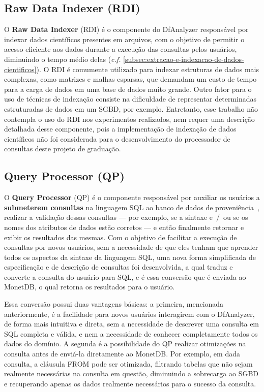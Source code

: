 \subsection{Raw Data Indexer (RDI)}

O \textbf{Raw Data Indexer} (RDI) é o componente do DfAnalyzer responsável por indexar dados científicos presentes em arquivos, com o objetivo de permitir o acesso eficiente aos dados durante a execução das consultas pelos usuários, diminuindo o tempo médio delas (\textit{c.f.} \autoref{subsec:extracao-e-indexacao-de-dados-cientificos}). O RDI é comumente utilizado para indexar estruturas de dados mais complexas, como matrizes e malhas esparsas, que demandam um custo de tempo para a carga de dados em uma base de dados muito grande. Outro fator para o uso de técnicas de indexação consiste na dificuldade de representar determinadas estruturadas de dados em um SGBD, por exemplo. Entretanto, esse trabalho não contempla o uso do RDI nos experimentos realizados, nem requer uma descrição detalhada desse componente, pois a implementação de indexação de dados científicos não foi considerada para o desenvolvimento do processador de consultas deste projeto de graduação.

\subsection{Query Processor (QP)}

O \textbf{Query Processor} (QP) é o componente responsável por auxiliar os usuários a \textbf{submeterem consultas} na linguagem SQL ao banco de dados de proveniência~\cite{silva2016situ}, realizar a validação dessas consultas --- por exemplo, se a sintaxe e~/~ou se os nomes dos atributos de dados estão corretos --- e então finalmente retornar e exibir os resultados das mesmas. Com o objetivo de facilitar a execução de consultas por novos usuários, sem a necessidade de que eles tenham que aprender todos os aspectos da sintaxe da linguagem SQL, uma nova forma simplificada de especificação e de descrição de consultas foi desenvolvida, a qual traduz e converte a consulta do usuário para SQL, e é essa conversão que é enviada ao MonetDB, o qual retorna os resultados para o usuário.

Essa conversão possui duas vantagens básicas: a primeira, mencionada anteriormente, é a facilidade para novos usuários interagirem com o DfAnalyzer, de forma mais intuitiva e direta, sem a necessidade de descrever uma consulta em SQL completa e válida, e nem a necessidade de conhecer completamente todos os dados do domínio. A segunda é a possibilidade do QP realizar otimizações na consulta antes de enviá-la diretamente ao MonetDB. Por exemplo, em dada consulta, a cláusula \textsc{FROM} pode ser otimizada, filtrando tabelas que não sejam realmente necessárias na consulta em questão, diminuindo a sobrecarga ao SGBD e recuperando apenas os dados realmente necessários para o sucesso da consulta.

